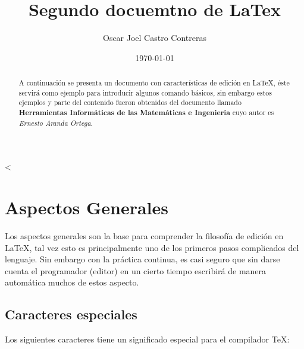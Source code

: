 <\documentclass[11pt,letter]{article} %
\title{Segundo docuemtno de LaTex}
\author{Oscar Joel Castro Contreras}
\date{\today}
\begin{document}
          \maketitle %




          \begin{abstract}
          A continuación se presenta un documento con características 
          de edición en \LaTeX, éste servirá como ejemplo para introducir 
          algunos comando básicos, sin embargo estos ejemplos y parte 
          del contenido fueron obtenidos del documento llamado 
          \textbf{Herramientas Informáticas de las Matemáticas e Ingeniería} 
          cuyo autor es \textit{Ernesto Aranda Ortega}.
          \end{abstract}

          \section{Aspectos Generales}
          \label{sec:aspgenerales} %

          Los aspectos generales son la base para comprender la filosofía 
          de edición en \LaTeX, tal vez esto es principalmente uno de 
          los primeros pasos complicados del lenguaje. Sin embargo con 
          la práctica continua, es casi seguro que sin darse cuenta 
          el programador (editor) en un cierto tiempo escribirá de manera 
          automática muchos de estos aspecto.

          \subsection{Caracteres especiales} 
          \label{sec:caracteresesp}

          Los siguientes caracteres tiene un significado especial para 
          el compilador \TeX:
\end{document}
